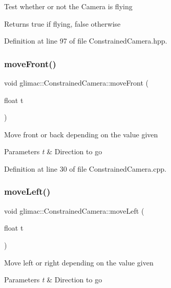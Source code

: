 Test whether or not the Camera is flying \begin{DoxyReturn}{Returns}
true if flying, false otherwise 
\end{DoxyReturn}


Definition at line 97 of file Constrained\+Camera.\+hpp.

\mbox{\label{classglimac_1_1_constrained_camera_a3152184b206c433d3b2619c0a86b22e1}} 
\subsubsection{\texorpdfstring{move\+Front()}{moveFront()}}
{\footnotesize\ttfamily void glimac\+::\+Constrained\+Camera\+::move\+Front (\begin{DoxyParamCaption}\item[{float}]{t }\end{DoxyParamCaption})}

Move front or back depending on the value given 
\begin{DoxyParams}{Parameters}
{\em t} & Direction to go \\
\hline
\end{DoxyParams}


Definition at line 30 of file Constrained\+Camera.\+cpp.

\mbox{\label{classglimac_1_1_constrained_camera_a3a74d3c7f7804a0b1a64a46b2d602cea}} 
\subsubsection{\texorpdfstring{move\+Left()}{moveLeft()}}
{\footnotesize\ttfamily void glimac\+::\+Constrained\+Camera\+::move\+Left (\begin{DoxyParamCaption}\item[{float}]{t }\end{DoxyParamCaption})}

Move left or right depending on the value given 
\begin{DoxyParams}{Parameters}
{\em t} & Direction to go \\
\hline
\end{DoxyParams}


